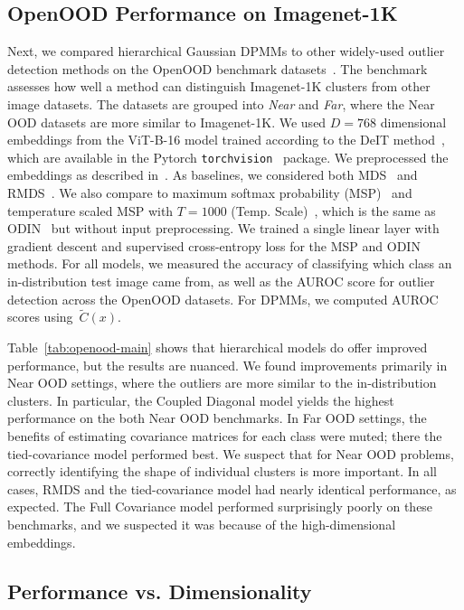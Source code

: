 \subsection{OpenOOD Performance on Imagenet-1K}

Next, we compared hierarchical Gaussian DPMMs to other widely-used outlier
detection methods on  the OpenOOD benchmark
datasets~\cite{yang2022openood,zhang23openood15}. The benchmark assesses how
well a method can distinguish Imagenet-1K clusters from other image datasets.
The datasets are grouped into \textit{Near} and \textit{Far}, where the Near
OOD datasets are more similar to Imagenet-1K. We used $D=768$ dimensional
embeddings from the ViT-B-16 model trained according to the DeIT
method~\citep{touvron2021training}, which are available in the Pytorch
\texttt{torchvision}~\citep{torchvision2016} package. We preprocessed the
embeddings as described in~. As baselines, we
considered both MDS~\citep{lee18mds} and RMDS~\citep{ren21rmds}. We also
compare to maximum softmax probability (MSP)~\citep{HendrycksD17} and
temperature scaled MSP with $T=1000$ (Temp. Scale)~\citep{guo17tempscale},
which is the same as ODIN~\citep{LiangS18} but without input preprocessing. We
trained a single linear layer with gradient descent and supervised
cross-entropy loss for the MSP and ODIN methods. For all models, we measured
the accuracy of classifying which class an in-distribution test image came
from, as well as the AUROC score for outlier detection across the OpenOOD
datasets. For DPMMs, we computed AUROC scores using~$\widetilde{C}(x)$.

Table~\ref{tab:openood-main} shows that hierarchical models do offer improved
performance, but the results are nuanced. We found improvements primarily in
Near OOD settings, where the outliers are more similar to the in-distribution
clusters. In particular, the Coupled Diagonal model yields the highest
performance on the both Near OOD benchmarks. In Far OOD settings, the benefits
of estimating covariance matrices for each class were muted; there the
tied-covariance model performed best. We suspect that for Near OOD problems,
correctly identifying the shape of individual clusters is more important. In
all cases, RMDS and the tied-covariance model had nearly identical performance,
as expected. The Full Covariance model performed surprisingly poorly on these
benchmarks, and we suspected it was because of the high-dimensional embeddings.

\subsection{Performance vs. Dimensionality}

